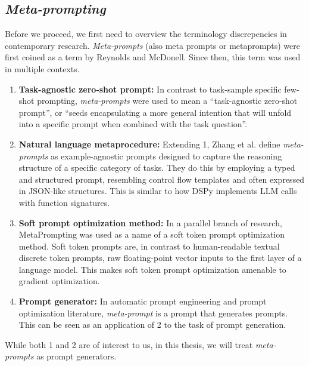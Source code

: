 \subsection{\textit{Meta-prompting}}
Before we proceed, we first need to overview the terminology discrepencies in contemporary research. 
\textit{Meta-prompts} (also meta prompts or metaprompts) were first coined as a term by Reynolds and McDonell\cite{reynolds2021promptprogramminglargelanguage}. 
Since then, this term was used in multiple contexts.
\begin{enumerate}
    \item \textbf{Task-agnostic zero-shot prompt:} In contrast to task-sample specific few-shot prompting, 
    \textit{meta-prompts} were used to mean a ``task-agnostic zero-shot prompt'', or ``seeds encapsulating a more general intention that will unfold into
    a specific prompt when combined with the task question''\cite{reynolds2021promptprogramminglargelanguage}. 
    \item \textbf{Natural language metaprocedure:} Extending 1, Zhang et al.\cite{zhang2025metapromptingaisystems} define \textit{meta-prompts} as example-agnostic prompts
    designed to capture the reasoning structure of a specific category of tasks. They do this by employing a typed and structured prompt, 
    resembling control flow templates and often expressed in JSON-like structures.
    This is similar to how DSPy\cite{khattab2023dspycompilingdeclarativelanguage} implements LLM calls with function signatures.
    \item \textbf{Soft prompt optimization method:} In a parallel branch of research, MetaPrompting\cite{hou2023metapromptinglearninglearnbetter} 
    was used as a name of a soft token prompt optimization method. Soft token prompts are, in contrast to human-readable textual discrete token prompts, 
    raw floating-point vector inputs to the first layer of a language model. This makes soft token prompt optimization amenable to gradient optimization.
    \item \textbf{Prompt generator:} In automatic prompt engineering and prompt optimization literature, \textit{meta-prompt} is a prompt that generates prompts\cite{dewynter2024metaprompting}.
    This can be seen as an application of 2 to the task of prompt generation\cite{zhang2025metapromptingaisystems}.
\end{enumerate}

While both 1 and 2 are of interest to us, in this thesis, we will treat \textit{meta-prompts} as prompt generators. 

